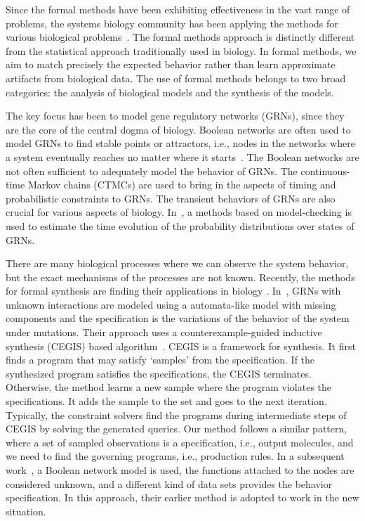 \documentclass{llncs}
\begin{document}

Since the formal methods have been exhibiting effectiveness in the vast
range of problems, the
systems biology community has been applying the methods for various
biological problems~\cite{fisher2007executable}.
The formal methods approach is distinctly different from the statistical
approach traditionally used in biology.
In formal methods, we aim to match precisely the expected behavior rather
than learn approximate artifacts from biological data.
The use of formal methods belongs to two broad categories:
the analysis of biological models and the synthesis of the models.

The key focus has been to model gene regulatory networks (GRNs), since
they are the core of the central dogma of biology.
Boolean networks are often used to model
GRNs to find stable points or attractors, i.e., nodes in the networks
where a system eventually reaches no matter where it starts~\cite{wang2012BooleanOverview}.
The Boolean networks are not often sufficient to adequately model the behavior
of GRNs.
The continuous-time Markov chains (CTMCs) are used to bring in the aspects of
timing and probabilistic constraints to GRNs.
The transient behaviors of GRNs are also crucial for various aspects
of biology.
In~\cite{delayedCTMC}, a methods based on
model-checking is used to estimate the time evolution of the probability
distributions over states of GRNs.


There are many biological processes where we can observe the system behavior,
but the exact mechanisms of the processes are not known.
%
Recently, the methods for formal synthesis are finding their applications in biology
\cite{dunn2014defining,xuPluripotency,booleanModelKarp13,paoletti2014analyzing}.
%
In~\cite{koksal2013synthesis},
GRNs with unknown interactions are modeled using
a automata-like model with missing components
and the specification is the variations of the behavior of the system under mutations.
Their approach uses a counterexample-guided inductive synthesis (CEGIS) based algorithm~\cite{cegis}.
CEGIS is a framework for synthesis. It first finds a program that may satisfy `samples' from
the specification. If the synthesized program satisfies the specifications, the CEGIS terminates.
Otherwise, the method learns a new sample where the program violates the specifications.
It adds the sample to the set and goes to the next iteration.
Typically, the constraint solvers find the programs during intermediate steps of CEGIS by
solving the generated queries.
%
Our method follows a similar pattern, where
a set of sampled observations is a specification, i.e., output molecules,
and we need to find the governing programs, i.e., production rules.
%
In a subsequent work~\cite{fisher2015synthesising}, a Boolean network model is used,
the functions attached to the nodes are considered unknown, and
a different kind of data sets provides the behavior specification.
In this approach, their earlier method is adopted to work in the new situation.
%
\end{document}
